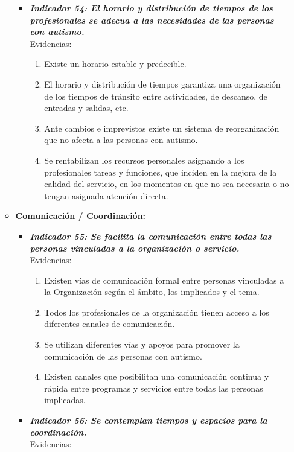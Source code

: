 \begin{itemize}
\begin{itemize}
\begin{itemize}
\begin{enumerate}
			\end{enumerate}
			\item \textbf{\textit{Indicador 54: El horario y distribución de tiempos de los profesionales se adecua a las necesidades de las personas con autismo.}}\\Evidencias:
			
			\begin{enumerate}
				\item Existe un horario estable y predecible. 
				\item El horario y distribución de tiempos garantiza una organización de los tiempos de tránsito entre actividades, de descanso, de entradas y salidas, etc. 
				\item Ante cambios e imprevistos existe un sistema de reorganización que no afecta a las personas con autismo. 
				\item Se rentabilizan los recursos personales asignando a los profesionales tareas y funciones, que inciden en la mejora de la calidad del servicio, en los momentos en que no sea necesaria o no tengan asignada atención directa. 
				
			\end{enumerate}
		\end{itemize}
		\item \textbf{Comunicación / Coordinación:}
		\begin{itemize}
			\item \textbf{\textit{Indicador 55: Se facilita la comunicación entre todas las personas vinculadas a la organización o servicio.}}\\Evidencias:
			
			\begin{enumerate}
				\item Existen vías de comunicación formal entre personas vinculadas a la Organización según el ámbito, los implicados y el tema. 
				\item Todos los profesionales de la organización tienen acceso a los diferentes canales de comunicación. 
				\item Se utilizan diferentes vías y apoyos para promover la comunicación de las personas con autismo. 
				\item Existen canales que posibilitan una comunicación continua y rápida entre programas y servicios entre todas las personas implicadas. 
			\end{enumerate}
			\item \textbf{\textit{Indicador 56: Se contemplan tiempos y espacios para la coordinación.}}\\Evidencias:
			

\end{itemize}
\end{itemize}
\end{itemize}
